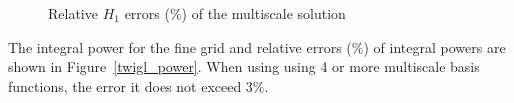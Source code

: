 \documentclass[preprint]{elsarticle}
\begin{document}
\begin{figure}[ht]
	\centering
	\quad
	\quad
	\caption{Relative $H_1$ errors ($\%$) of the multiscale solution}
	\label{twigl_H1}
\end{figure}

The integral power for the fine grid and relative errors ($\%$) of integral powers are shown in Figure~\ref{twigl_power}.
When using using 4 or more multiscale basis functions, the error it does not exceed 3\%.
\end{document}
